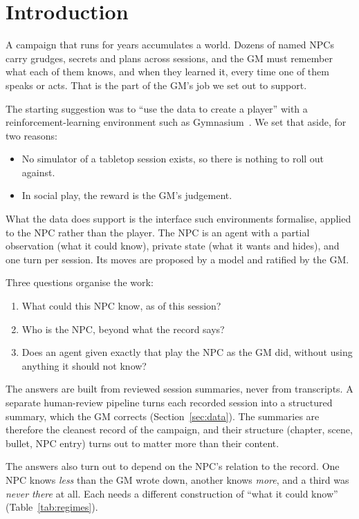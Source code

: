 \documentclass[11pt]{article}
\begin{document}
\section{Introduction}

A campaign that runs for years accumulates a world. Dozens of named NPCs carry
grudges, secrets and plans across sessions, and the GM must remember what each of them
knows, and when they learned it, every time one of them speaks or acts. That is the
part of the GM's job we set out to support.

The starting suggestion was to ``use the data to create a player'' with a
reinforcement-learning environment such as Gymnasium~\citep{towers2024gymnasium}. We
set that aside, for two reasons:
\begin{itemize}[nosep]
\item No simulator of a tabletop session exists, so there is nothing to roll out
against.
\item In social play, the reward is the GM's judgement.
\end{itemize}
What the data does support is the interface such environments formalise, applied to
the NPC rather than the player. The NPC is an agent with a partial observation (what
it could know), private state (what it wants and hides), and one turn per session.
Its moves are proposed by a model and ratified by the GM.

Three questions organise the work:
\begin{enumerate}[nosep]
\item What could this NPC know, as of this session?
\item Who is the NPC, beyond what the record says?
\item Does an agent given exactly that play the NPC as the GM did, without using
anything it should not know?
\end{enumerate}

The answers are built from reviewed session summaries, never from transcripts. A
separate human-review pipeline turns each recorded session into a structured summary,
which the GM corrects (Section~\ref{sec:data}). The summaries are therefore the
cleanest record of the campaign, and their structure (chapter, scene, bullet, NPC
entry) turns out to matter more than their content.

The answers also turn out to depend on the NPC's relation to the record. One NPC knows
\emph{less} than the GM wrote down, another knows \emph{more}, and a third was
\emph{never there} at all. Each needs a different construction of ``what it could
know'' (Table~\ref{tab:regimes}).
\end{document}

